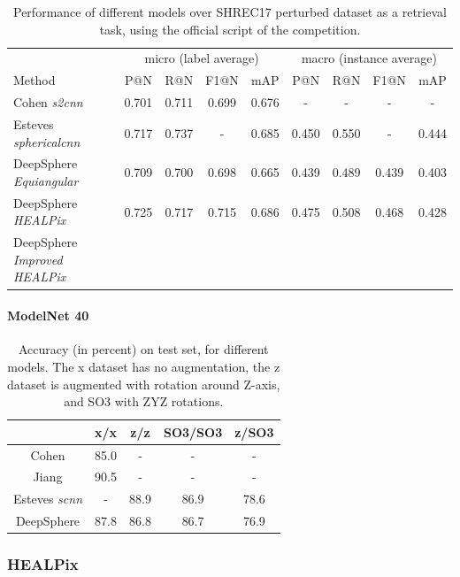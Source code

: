 \documentclass{article} %
\begin{document}
\begin{table}[!ht]
    \centering
    \begin{tabular}{l|c c c c|c c c c}
     & \multicolumn{4}{c|}{micro (label average)} & \multicolumn{4}{c}{macro (instance average)} \\
    Method & P@N & R@N & F1@N & mAP & P@N & R@N & F1@N & mAP \\ \hline
    Cohen \emph{s2cnn} & 0.701 & 0.711 & 0.699 & 0.676 & - & - & - & - \\
    Esteves \emph{sphericalcnn} & 0.717 & 0.737 & - & 0.685 & 0.450 & 0.550 & - & 0.444\\ \hline
    DeepSphere \emph{Equiangular} & 0.709 & 0.700 & 0.698 & 0.665 & 0.439 & 0.489 & 0.439 & 0.403 \\
    DeepSphere \emph{HEALPix} & 0.725 & 0.717 & 0.715 & 0.686 & 0.475 & 0.508 & 0.468 & 0.428\\
    DeepSphere \emph{Improved HEALPix} & & & & &
    \end{tabular}
    \caption{Performance of different models over SHREC17 perturbed dataset as a retrieval task, using the official script of the competition.}
    \label{tab:SHREC17_retriev}
\end{table}

\paragraph*{ModelNet 40}
\begin{table}[!ht]
    \centering
    \begin{tabular}{c|cccc}
         &  x/x & z/z & SO3/SO3 & z/SO3 \\ \hline
Cohen & 85.0 & - & - & - \\
Jiang & 90.5 & - & - & - \\
Esteves \emph{scnn} & - & 88.9 & 86.9 & 78.6 \\
DeepSphere & 87.8 & 86.8 & 86.7 & 76.9
    \end{tabular}
    \caption{Accuracy (in percent) on test set, for different models. The x dataset has no augmentation, the z dataset is augmented with rotation around Z-axis, and SO3 with ZYZ rotations.}
    \label{tab:mn40_results}
\end{table}
\subsubsection*{HEALPix}
\end{document}

